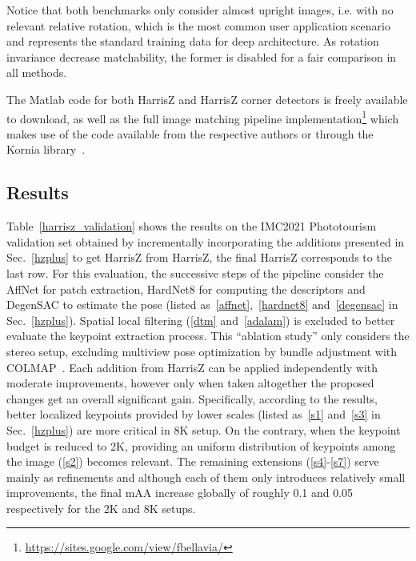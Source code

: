 \documentclass[times,twocolumn,final,authoryear]{elsarticle}
\begin{document}
Notice that both benchmarks only consider almost upright images, i.e. with no relevant relative rotation, which is the most common user application scenario and represents the standard training data for deep architecture. As rotation invariance decrease matchability, the former is disabled for a fair comparison in all methods.  

The Matlab code for both HarrisZ and HarrisZ corner detectors is freely available to download, as well as the full image matching pipeline implementation\footnote{\scriptsize{\url{https://sites.google.com/view/fbellavia/}}} which makes use of the code available from the respective authors or through the Kornia library~\citep{kornia}.

\vspace{-1em}
\subsection{Results}
Table~\ref{harrisz_validation} shows the results on the IMC2021 Phototourism validation set obtained by incrementally incorporating the additions presented in Sec.~\ref{hzplus} to get HarrisZ from HarrisZ, the final HarrisZ corresponds to the last row. For this evaluation, the successive steps of the pipeline consider the AffNet for patch extraction, HardNet8 for computing the descriptors and DegenSAC to estimate the pose (listed as~\ref{affnet},~\ref{hardnet8} and~\ref{degensac} in Sec.~\ref{hzplus}). Spatial local filtering (\ref{dtm} and~\ref{adalam}) is excluded to better evaluate the keypoint extraction process. This ``ablation study'' only considers the stereo setup, excluding multiview pose optimization by bundle adjustment with COLMAP~\citep{colmap}. Each addition from HarrisZ can be applied independently with moderate improvements, however only when taken altogether the proposed changes get an overall significant gain. Specifically, according to the results, better localized keypoints provided by lower scales (listed as~\ref{s1} and~\ref{s3} in Sec.~\ref{hzplus}) are more critical in 8K setup. On the contrary, when the keypoint budget is reduced to 2K, providing an uniform distribution of keypoints among the image (\ref{s2}) becomes relevant. The remaining extensions (\ref{s4}-\ref{s7}) serve mainly as refinements and although each of them only introduces relatively small improvements, the final mAA increase globally of roughly 0.1 and 0.05 respectively for the 2K and 8K setups.
\vspace{-0.5em}
\end{document}

